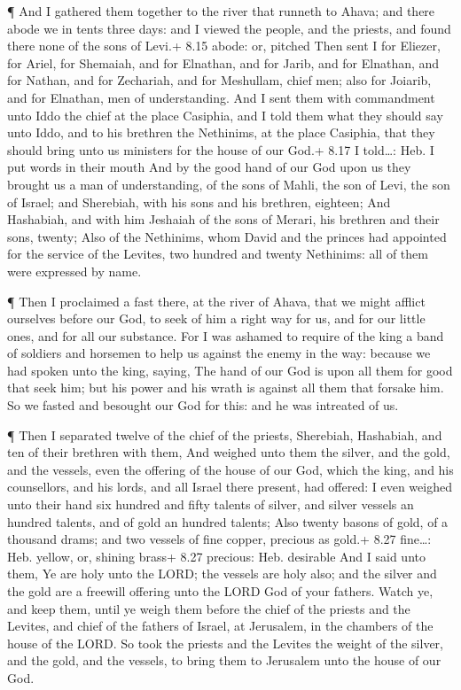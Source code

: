  ¶ And I gathered them together to the river that runneth
to Ahava; and there abode we in tents three days: and I viewed the
people, and the priests, and found there none of the sons of Levi.+ 8.15
abode: or, pitched  Then sent I for Eliezer, for Ariel, for
Shemaiah, and for Elnathan, and for Jarib, and for Elnathan, and for
Nathan, and for Zechariah, and for Meshullam, chief men; also for
Joiarib, and for Elnathan, men of understanding.  And I
sent them with commandment unto Iddo the chief at the place Casiphia,
and I told them what they should say unto Iddo, and to his brethren the
Nethinims, at the place Casiphia, that they should bring unto us
ministers for the house of our God.+ 8.17 I told\ldots: Heb. I put words
in their mouth  And by the good hand of our God upon us
they brought us a man of understanding, of the sons of Mahli, the son of
Levi, the son of Israel; and Sherebiah, with his sons and his brethren,
eighteen;  And Hashabiah, and with him Jeshaiah of the sons
of Merari, his brethren and their sons, twenty;  Also of
the Nethinims, whom David and the princes had appointed for the service
of the Levites, two hundred and twenty Nethinims: all of them were
expressed by name.

 ¶ Then I proclaimed a fast there, at the river of Ahava,
that we might afflict ourselves before our God, to seek of him a right
way for us, and for our little ones, and for all our substance.
 For I was ashamed to require of the king a band of
soldiers and horsemen to help us against the enemy in the way: because
we had spoken unto the king, saying, The hand of our God is upon all
them for good that seek him; but his power and his wrath is against all
them that forsake him.  So we fasted and besought our God
for this: and he was intreated of us.

 ¶ Then I separated twelve of the chief of the priests,
Sherebiah, Hashabiah, and ten of their brethren with them, 
And weighed unto them the silver, and the gold, and the vessels, even
the offering of the house of our God, which the king, and his
counsellors, and his lords, and all Israel there present, had offered:
 I even weighed unto their hand six hundred and fifty
talents of silver, and silver vessels an hundred talents, and of gold an
hundred talents;  Also twenty basons of gold, of a thousand
drams; and two vessels of fine copper, precious as gold.+ 8.27
fine\ldots: Heb. yellow, or, shining brass+ 8.27 precious: Heb.
desirable  And I said unto them, Ye are holy unto the LORD;
the vessels are holy also; and the silver and the gold are a freewill
offering unto the LORD God of your fathers.  Watch ye, and
keep them, until ye weigh them before the chief of the priests and the
Levites, and chief of the fathers of Israel, at Jerusalem, in the
chambers of the house of the LORD.  So took the priests and
the Levites the weight of the silver, and the gold, and the vessels, to
bring them to Jerusalem unto the house of our God.

